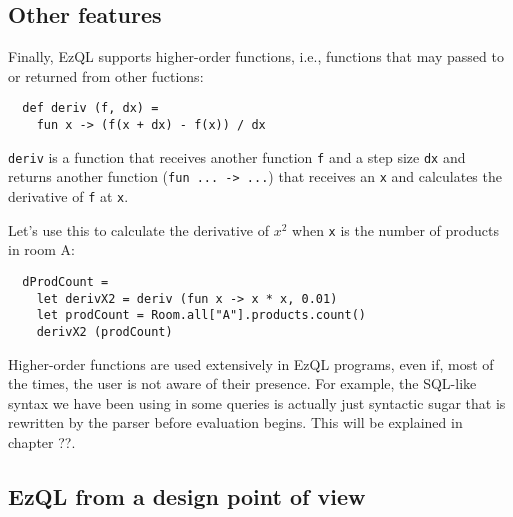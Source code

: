 \documentclass[a4,11pt]{report}
\begin{document}
\subsection{Other features}


Finally, EzQL supports higher-order functions, i.e., functions that
may passed to or returned from other fuctions:

\begin{lstlisting}
  def deriv (f, dx) =
    fun x -> (f(x + dx) - f(x)) / dx
\end{lstlisting}

\verb=deriv= is a function that receives another function \verb=f= and
a step size \verb=dx= and returns another function
(\verb=fun ... -> ...=) that receives an \verb=x= and calculates the
derivative of \verb=f= at \verb=x=.

Let's use this to calculate the derivative of \(x^2\) when \verb=x=
is the number of products in room A:

\begin{lstlisting}
  dProdCount =
    let derivX2 = deriv (fun x -> x * x, 0.01)
    let prodCount = Room.all["A"].products.count()
    derivX2 (prodCount)
\end{lstlisting}

Higher-order functions are used extensively in EzQL programs, even if,
most of the times, the user is not aware of their presence. For
example, the SQL-like syntax we have been using in some queries is
actually just syntactic sugar that is rewritten by the parser before
evaluation begins. This will be explained in chapter ??.


\subsection{EzQL from a design point of view}
\end{document}

